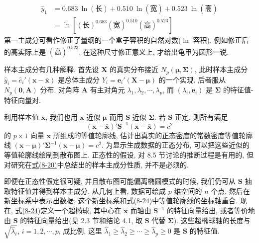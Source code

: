 
\[
\begin{aligned}
\hat{y}_1&=0.683\ \ln(\text{长})+0.510\ \ln(\text{宽})+0.523\ \ln(\text{高})\\
&=\ln[(\text{长})^{0.683}(\text{宽})^{0.510}(\text{高})^{0.523}]
\end{aligned}
\]
第一主成分可看作修正了量纲的一个盒子容积的自然对数($\ln$ 容积). 例如修正后的高实际上是 $(\text{高})^{0.523}$, 在这种尺寸修正意义上, 才给出龟甲为圆形一说.


样本主成分有几种解释. 首先设 $\mathbf{X}$ 的真实分布接近 $N_p(\boldsymbol{\mu},\boldsymbol{\Sigma})$, 此时样本主成分 $\hat{y}_i=\hat{e}_i'(\mathbf{x}-\bar{\mathbf{x}})$ 是总体主成分 $Y_i=\mathbf{e}_i'(\mathbf{X}-\boldsymbol{\mu})$ 的一个实现, 后者服从 $N_p(\mathbf{0},\mathbf{A})$ 分布. 对角阵 $\mathbf{A}$ 有主对角元 $\lambda_1,\lambda_2,\cdots,\lambda_p$, 而 $(\lambda_i,\mathbf{e}_i)$ 是 $\boldsymbol{\Sigma}$ 的特征值-特征向量对.

利用样本值 $\mathbf{x}$, 我们也用 $\mathbf{x}$ 近似 $\boldsymbol{\mu}$ 而用 $\mathbf{S}$ 近似 $\boldsymbol{\Sigma}$. 若 $\mathbf{S}$ 正定, 则所有满足
\label{eq:8-24}
\begin{equation}
(\mathbf{x}-\bar{\mathbf{x}})'\mathbf{S}^{-1}(\mathbf{x}-\bar{\mathbf{x}})=c^2 \tag{8-24}
\end{equation}
的 $p\times 1$ 向量 $\mathbf{x}$ 所组成的等值轮廓线, 估计出真实的正态密度的常数密度等值轮廓线 $(\mathbf{x}-\boldsymbol{\mu})'\boldsymbol{\Sigma}^{-1}(\mathbf{x}-\boldsymbol{\mu})=c^2$. 为显示生成数据的正态分布, 可以把这些近似的等值轮廓线绘制到散布图上. 正态性的假设, 对 8.5 节讨论的推断过程是有用的, 但对研究在\hyperref[eq:8-20]{式(8-20)}中总结出的样本主成分性质, 并不是必须的.

即便在正态性假定很可疑, 并且散布图可能偏离椭圆模式的时候, 我们仍可从 $\mathbf{S}$ 抽取特征值并得到样本主成分. 从几何上看, 数据可绘成 $p$ 维空间的 $n$ 个点, 然后在新坐标系中表示出数据, 这个新坐标系和\hyperref[eq:8-24]{式(8-24)}中等值轮廓线的坐标轴重合. 现在, \hyperref[eq:8-24]{式(8-24)}定义一个超椭球, 其中心在 $\bar{\mathbf{x}}$ 而轴由 $\mathbf{S}^{-1}$ 的特征向量给出, 或者等价地由 $\mathbf{S}$ 的特征向量给出(见 2.3 节和结论 4.1, 取 $\mathbf{S}$ 代替 $\boldsymbol{\Sigma}$). 这些超椭球轴的长度与 $\sqrt{\hat{\lambda}_i}$, $i=1,2,\cdots,p$, 成比例, 这里 $\hat{\lambda}_1\geqslant\hat{\lambda}_2\geqslant\cdots\geqslant\hat{\lambda}_p\geqslant 0$ 是 $\mathbf{S}$ 的特征值.

